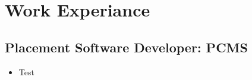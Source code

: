 \section*{Work Experiance}

\subsection*{Placement Software Developer: PCMS}
\begin{itemize}
    \item Test
\end{itemize}
